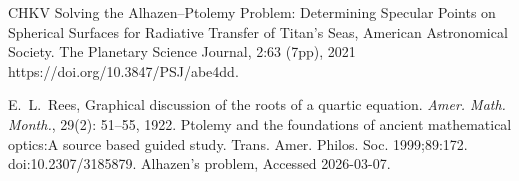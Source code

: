 \documentclass[12pt,a4paper]{amsart}
\theoremstyle{plain}
\theoremstyle{definition}
\theoremstyle{remark}
\numberwithin{equation}{section}
\begin{document}
\begin{thebibliography}{CHKV}
 Solving the Alhazen--Ptolemy Problem: Determining Specular Points on Spherical Surfaces for Radiative Transfer of Titan's Seas,
American Astronomical Society.
The Planetary Science Journal, 2:63 (7pp), 2021 
https://doi.org/10.3847/PSJ/abe4dd.




{\sc E.~L.~Rees,}
 {Graphical discussion of the roots of a quartic equation}.
 {\em {Amer. Math. Month.}}, 29(2): 51--55, 1922.
 Ptolemy and the foundations of 
ancient mathematical optics:A source based guided
study. Trans. Amer. Philos. Soc. 1999;89:172. doi:10.2307/3185879.
 Alhazen's problem, Accessed 2026-03-07.

\end{thebibliography}
\end{document}
